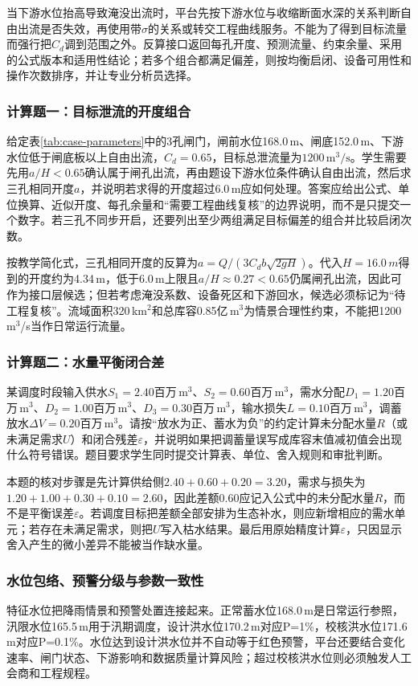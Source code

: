当下游水位抬高导致淹没出流时，平台先按下游水位与收缩断面水深的关系判断自由出流是否失效，再使用带$\sigma$的关系或转交工程曲线服务。不能为了得到目标流量而强行把$C_d$调到范围之外。反算接口返回每孔开度、预测流量、约束余量、采用的公式版本和适用性结论；若多个组合都满足偏差，则按均衡启闭、设备可用性和操作次数排序，并让专业分析员选择。

\subsubsection{计算题一：目标泄流的开度组合}
给定表\ref{tab:case-parameters}中的3孔闸门，闸前水位168.0\,m、闸底152.0\,m、下游水位低于闸底板以上自由出流，$C_d=0.65$，目标总泄流量为$1200\,\mathrm{m^3/s}$。学生需要先用$a/H<0.65$确认属于闸孔出流，再由题设下游水位条件确认自由出流，然后求三孔相同开度$a$，并说明若求得的开度超过6.0\,m应如何处理。答案应给出公式、单位换算、近似开度、每孔余量和“需要工程曲线复核”的边界说明，而不是只提交一个数字。若三孔不同步开启，还要列出至少两组满足目标偏差的组合并比较启闭次数。

按教学简化式，三孔相同开度的反算为$a=Q/(3C_db\sqrt{2gH})$。代入$H=16.0\,m$得到的开度约为4.34\,m，低于6.0\,m上限且$a/H\approx0.27<0.65$仍属闸孔出流，因此可作为接口层候选；但若考虑淹没系数、设备死区和下游回水，候选必须标记为“待工程复核”。流域面积320\,km$^2$和总库容0.85亿\,m$^3$为情景合理性约束，不能把1200\,m$^3$/s当作日常运行流量。

\subsubsection{计算题二：水量平衡闭合差}
某调度时段输入供水$S_1=2.40$百万\,m$^3$、$S_2=0.60$百万\,m$^3$，需水分配$D_1=1.20$百万\,m$^3$、$D_2=1.00$百万\,m$^3$、$D_3=0.30$百万\,m$^3$，输水损失$L=0.10$百万\,m$^3$，调蓄放水$\Delta V=0.20$百万\,m$^3$。请按“放水为正、蓄水为负”的约定计算未分配水量$R$（或未满足需求$U$）和闭合残差$\varepsilon$，并说明如果把调蓄量误写成库容末值减初值会出现什么符号错误。题目要求学生同时提交计算表、单位、舍入规则和审批判断。

本题的核对步骤是先计算供给侧$2.40+0.60+0.20=3.20$，需求与损失为$1.20+1.00+0.30+0.10=2.60$，因此差额$0.60$应记入公式中的未分配水量$R$，而不是平衡误差$\varepsilon$。若调度目标把差额全部安排为生态补水，则应新增相应的需水单元；若存在未满足需求，则把$U$写入枯水结果。最后用原始精度计算$\varepsilon$，只因显示舍入产生的微小差异不能被当作缺水量。

\subsubsection{水位包络、预警分级与参数一致性}
特征水位把降雨情景和预警处置连接起来。正常蓄水位168.0\,m是日常运行参照，汛限水位165.5\,m用于汛期调度，设计洪水位170.2\,m对应P=1\%，校核洪水位171.6\,m对应P=0.1\%。水位达到设计洪水位并不自动等于红色预警，平台还要结合变化速率、闸门状态、下游影响和数据质量计算风险；超过校核洪水位则必须触发人工会商和工程规程。

